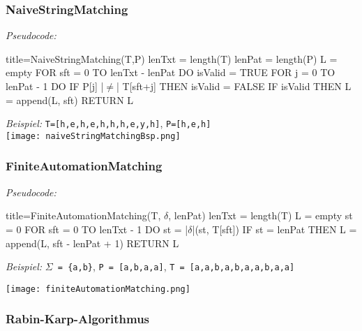         \subsubsection{NaiveStringMatching}
            \begin{minipage}{0.4\textwidth}
                \textit{Pseudocode:}
                \begin{ccode}[autogobble,escapeinside=||]{title={NaiveStringMatching(T,P)}}
                lenTxt = length(T)
                lenPat = length(P)
                L = empty
                FOR sft = 0 TO lenTxt - lenPat DO
                    isValid = TRUE
                    FOR j = 0 TO lenPat - 1 DO
                        IF P[j] |$\neq$| T[sft+j] THEN
                            isValid = FALSE
                    IF isValid THEN
                        L = append(L, sft)
                RETURN L
                \end{ccode}
            \end{minipage}
            \begin{minipage}{0.5\textwidth}
                \textit{Beispiel:} \texttt{T=[h,e,h,e,h,h,h,e,y,h]}, \texttt{P=[h,e,h]} \\
                \texttt{[image: naiveStringMatchingBsp.png]}
            \end{minipage}

        \subsubsection{FiniteAutomationMatching}
            \textit{Pseudocode:}
            \begin{ccode}[autogobble,escapeinside=||]{title={FiniteAutomationMatching(T, $\delta$, lenPat)}}
            lenTxt = length(T)
            L = empty
            st = 0
            FOR sft = 0 TO lenTxt - 1 DO
                st = |$\delta$|(st, T[sft])
                IF st = lenPat THEN
                    L = append(L, sft - lenPat + 1)
            RETURN L
            \end{ccode}

            \noindent
            \textit{Beispiel:} \texttt{$\Sigma$ = \{a,b\}}, \texttt{P = [a,b,a,a]}, \texttt{T = [a,a,b,a,b,a,a,b,a,a]} \\
            \centerline{\texttt{[image: finiteAutomationMatching.png]}}
\pagebreak
        \subsubsection{Rabin-Karp-Algorithmus}


